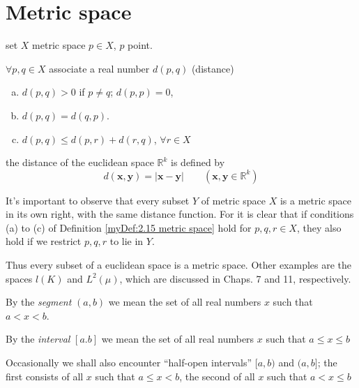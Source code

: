 \section{Metric space}
\begin{myDef}\label{myDef:2.15 metric space}
    set $X$ metric space $p\in X$, $p$ point.

    $\forall p,q \in X$ associate a real number $d(p,q)$ (distance)
    \begin{enumerate}[a.]
        \item $d(p,q) > 0$ if $p \neq q$; $d(p,p)=0$,
        \item $d(p,q) = d(q,p)$.
        \item $d(p,q) \leq d(p,r) + d(r,q)$, $\forall r\in X$
    \end{enumerate}
\end{myDef}

\begin{myExample}
    the distance of the euclidean space $\mathbb{R}^k$ is defined by
    \begin{equation}\label{eq:2.19}
        d(\mathbf{x}, \mathbf{y}) = |\mathbf{x} - \mathbf{y}|
        \qquad (\mathbf{x}, \mathbf{y}\in \mathbb{R}^k)
    \end{equation}
\end{myExample}

It's important to observe that every subset $Y$ of metric space $X$ is a metric space in its own right, with the same distance function. For it is clear that if conditions (a) to (c) of Definition \ref{myDef:2.15 metric space} hold for $p, q, r \in X$, they also hold if we restrict $p, q, r$ to lie in $Y$.

Thus every subset of a euclidean space is a metric space. Other examples
are the spaces $l(K)$ and $L^2 (\mu)$, 
which are discussed in Chaps. 7 and 11, respectively.


\begin{myDef}\label{myDef:2.17 segment}
By the \emph{segment} $(a, b)$ we mean the set of all real numbers $x$
such that $a < x <b$.

By the \emph{interval} $[a. b]$ we mean the set of all real numbers $x$ such that $a \leq x \leq b$

Occasionally we shall also encounter ``half-open intervals'' $[a, b)$ and $(a, b]$; the first consists of all $x$ such that $a \leq x < b$, the second of all $x$ such that $a < x \leq b$
\end{myDef}

